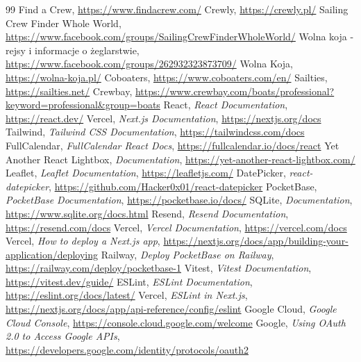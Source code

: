 \documentclass[shortabstract]{iithesis}
\begin{document}
\begin{thebibliography}{99}
 Find a Crew, \url{https://www.findacrew.com/}
 Crewly, \url{https://crewly.pl/}
 Sailing Crew Finder Whole World, \url{https://www.facebook.com/groups/SailingCrewFinderWholeWorld/}
 Wolna koja - rejsy i informacje o żeglarstwie, \url{https://www.facebook.com/groups/262932323873709/}
 Wolna Koja, \url{https://wolna-koja.pl/}
 Coboaters, \url{https://www.coboaters.com/en/}
 Sailties, \url{https://sailties.net/}
 Crewbay, \url{https://www.crewbay.com/boats/professional?keyword=professional&group=boats}
 React, \textit{React Documentation}, \url{https://react.dev/}
 Vercel, \textit{Next.js Documentation}, \url{https://nextjs.org/docs}
 Tailwind, \textit{Tailwind CSS Documentation}, \url{https://tailwindcss.com/docs}
 FullCalendar, \textit{FullCalendar React Docs}, \url{https://fullcalendar.io/docs/react}
 Yet Another React Lightbox, \textit{Documentation}, \url{https://yet-another-react-lightbox.com/}
 Leaflet, \textit{Leaflet Documentation}, \url{https://leafletjs.com/}
 DatePicker, \textit{react-datepicker}, \url{https://github.com/Hacker0x01/react-datepicker}
 PocketBase, \textit{PocketBase Documentation}, \url{https://pocketbase.io/docs/}
 SQLite, \textit{Documentation}, \url{https://www.sqlite.org/docs.html}
 Resend, \textit{Resend Documentation}, \url{https://resend.com/docs}
 Vercel, \textit{Vercel Documentation}, \url{https://vercel.com/docs}
 Vercel, \textit{How to deploy a Next.js app}, \url{https://nextjs.org/docs/app/building-your-application/deploying}
 Railway, \textit{Deploy PocketBase on Railway}, \url{https://railway.com/deploy/pocketbase-1}
 Vitest, \textit{Vitest Documentation}, \url{https://vitest.dev/guide/}
 ESLint, \textit{ESLint Documentation}, \url{https://eslint.org/docs/latest/}
 Vercel, \textit{ESLint in Next.js}, \url{https://nextjs.org/docs/app/api-reference/config/eslint}
 Google Cloud, \textit{Google Cloud Console}, \url{https://console.cloud.google.com/welcome}
 Google, \textit{Using OAuth 2.0 to Access Google APIs}, \url{https://developers.google.com/identity/protocols/oauth2}
\end{thebibliography}
\end{document}
